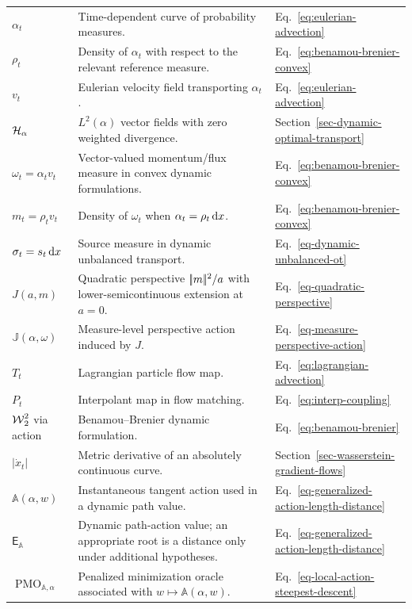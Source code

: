 {\begin{longtable}{>{\raggedright\arraybackslash}p{}
                  >{\raggedright\arraybackslash}p{}
                  >{\raggedright\arraybackslash}p{}}
\hline
\multicolumn{3}{l}{\textbf{Dynamic OT and Wasserstein gradient flows}}\\
\hline
$\alpha_t$ & Time-dependent curve of probability measures. & Eq.~\eqref{eq:eulerian-advection} \\
$\rho_t$ & Density of $\alpha_t$ with respect to the relevant reference measure. & Eq.~\eqref{eq:benamou-brenier-convex} \\
$v_t$ & Eulerian velocity field transporting $\alpha_t$. & Eq.~\eqref{eq:eulerian-advection} \\
$\mathcal{H}_\alpha$ & $L^2(\alpha)$ vector fields with zero weighted divergence. & Section~\ref{sec-dynamic-optimal-transport} \\
$\omega_t=\alpha_t v_t$ & Vector-valued momentum/flux measure in convex dynamic formulations. & Eq.~\eqref{eq:benamou-brenier-convex} \\
$m_t=\rho_t v_t$ & Density of $\omega_t$ when $\alpha_t=\rho_t\,\mathrm{d} x$. & Eq.~\eqref{eq:benamou-brenier-convex} \\
$\sigma_t=s_t\,\mathrm{d} x$ & Source measure in dynamic unbalanced transport. & Eq.~\eqref{eq-dynamic-unbalanced-ot} \\
$J(a,m)$ & Quadratic perspective $|\!| m |\!|^2/a$ with lower-semicontinuous extension at $a=0$. & Eq.~\eqref{eq-quadratic-perspective} \\
$\mathbb J(\alpha,\omega)$ & Measure-level perspective action induced by $J$. & Eq.~\eqref{eq-measure-perspective-action} \\
$T_t$ & Lagrangian particle flow map. & Eq.~\eqref{eq:lagrangian-advection} \\
$P_t$ & Interpolant map in flow matching. & Eq.~\eqref{eq:interp-coupling} \\
$\operatorname{\mathcal{W}}_2^2$ via action & Benamou--Brenier dynamic formulation. & Eq.~\eqref{eq:benamou-brenier} \\
$|\dot x_t|$ & Metric derivative of an absolutely continuous curve. & Section~\ref{sec-wasserstein-gradient-flows} \\
$\mathbb A(\alpha,w)$ & Instantaneous tangent action used in a dynamic path value. & Eq.~\eqref{eq-generalized-action-length-distance} \\
$\mathsf E_{\mathbb A}$ & Dynamic path-action value; an appropriate root is a distance only under additional hypotheses. & Eq.~\eqref{eq-generalized-action-length-distance} \\
$\operatorname{PMO}_{\mathbb A,\alpha}$ & Penalized minimization oracle associated with \(w\mapsto\mathbb A(\alpha,w)\). & Eq.~\eqref{eq-local-action-steepest-descent} \\

\end{longtable}}
